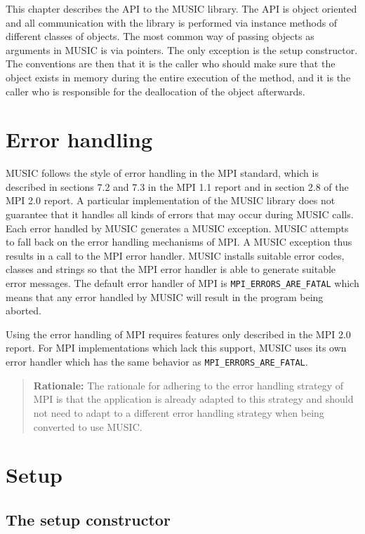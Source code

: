 \documentclass[a4paper]{report}
\newenvironment{rationale}%
{\par\begin{quote}\textbf{Rationale:}}%
{\par\end{quote}}
\begin{document}
This chapter describes the API to the MUSIC library.  The API is
object oriented and all communication with the library is performed
via instance methods of different classes of objects.  The most common
way of passing objects as arguments in MUSIC is via pointers.  The
only exception is the setup constructor.  The conventions are then
that it is the caller who should make sure that the object exists in
memory during the entire execution of the method, and it is the caller
who is responsible for the deallocation of the object afterwards.

\section{Error handling}

MUSIC follows the style of error handling in the MPI standard, which
is described in sections 7.2 and 7.3 in the MPI 1.1
report\cite{mpi1.1} and in section 2.8 of the MPI 2.0
report\cite{mpi2.0}.  A particular implementation of the MUSIC library
does not guarantee that it handles all kinds of errors that may occur
during MUSIC calls.  Each error handled by MUSIC generates a MUSIC
exception.  MUSIC attempts to fall back on the error handling
mechanisms of MPI.  A MUSIC exception thus results in a call to the
MPI error handler.  MUSIC installs suitable error codes, classes and
strings so that the MPI error handler is able to generate suitable
error messages.  The default error handler of MPI is
\lstinline|MPI_ERRORS_ARE_FATAL| which means that any error handled by
MUSIC will result in the program being aborted.

Using the error handling of MPI requires features only described in
the MPI 2.0 report.  For MPI implementations which lack this support,
MUSIC uses its own error handler which has the same behavior as
\lstinline|MPI_ERRORS_ARE_FATAL|.

\begin{rationale}
  The rationale for adhering to the error handling strategy of MPI is
  that the application is already adapted to this strategy and should
  not need to adapt to a different error handling strategy when being
  converted to use MUSIC.
\end{rationale}

\section{Setup}

\subsection{The setup constructor}
\end{document}
